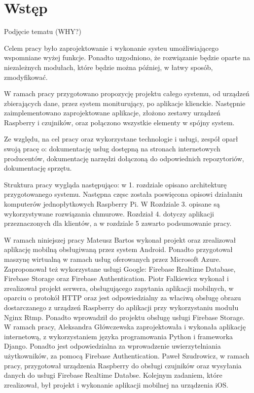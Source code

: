 

\chapter{Wstęp}

Podjęcie tematu (WHY?)

Celem pracy było zaprojektowanie i wykonanie systeu umożliwiającego wspomniane wyżej funkcje. Ponadto uzgodniono, że rozwiązanie będzie oparte na niezależnych modułach, które będzie można później, w łatwy sposób, zmodyfikować.

W ramach pracy przygotowano propozycję projektu całego systemu, od urządzeń zbierających dane, przez system moniturujący, po aplikacje klienckie. Następnie zaimplementowano zaprojektowane aplikacje, złożono zestawy urządzeń Raspberry i czujników, oraz połączono wszystkie elementy w spójny system.

Ze względu, na cel pracy oraz wykorzystane technologie i usługi, zespół oparł swoją pracę o: dokumentację usług dostępną na stronach internetowych producentów, dokumentację narzędzi dołączoną do odpowiednich repozytoriów, dokumentację sprzętu.

Struktura pracy wygląda następująco: w 1. rozdziale opisano architekturę przygotowanego systemu. Następna częsc została poswięcona opisowi działaniu komputerów jednopłytkowych Raspberry Pi. W Rozdziale 3. opisane są wykorzystywane rozwiązania chmurowe. Rozdział 4. dotyczy aplikacji przeznaczonych dla klientów, a w rozdziale 5 zawarto podsumowanie pracy.

W ramach niniejszej pracy Mateusz Bartos wykonał projekt oraz zrealizował aplikację mobilną obsługiwaną przez system Android. Ponadto przygotował maszynę wirtualną w ramach usług oferowanych przez Microsoft Azure. Zaproponował też wykorzystane usługi Google: Firebase Realtime Database, Firebase Storage oraz Firebase Authentication. 
Piotr Falkiewicz wykonał i zrealizował projekt serwera, obsługującego zapytania aplikacji mobilnych, w oparciu o protokół HTTP oraz jest odpowiedzialny za właciwą obsługę  obrazu dostarczanego z urządzeń Raspberry do aplikacji przy wykorzystaniu modułu Nginx Rtmp. Ponadto wprowadził do projektu obsługę usługi Firebase Storage.
W ramach pracy, Aleksandra Główczewska zaprojektowała i wykonała aplikację internetową, z wykorzystaniem języka programowania Python i frameworka Django. Ponadto jest odpowiedzialna za wprowadzenie uwierzytelniania użytkowników, za pomocą Firebase Authentication. 
Paweł Szudrowicz, w ramach pracy, przygotował urządzenia Raspberry do obsługi czujników oraz wysyłania danych do usługi Firebase Realtime Databse. Kolejnym zadaniem, które zrealizował, był projekt i wykonanie aplikacji mobilnej na urządzenia iOS.

